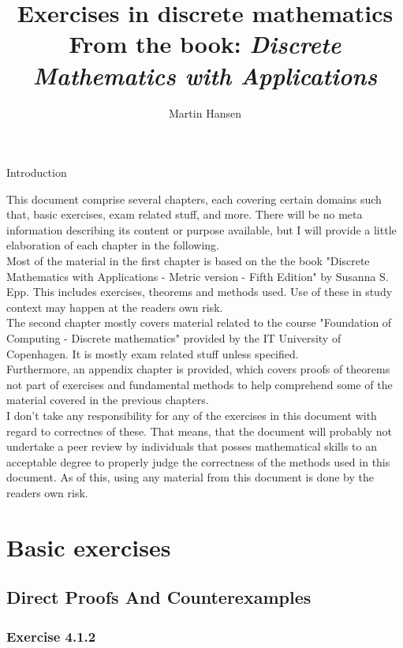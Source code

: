 \documentclass{report}
\author{Martin Hansen}
\title{Exercises in discrete mathematics\\ \small From the book: \textit{Discrete Mathematics with Applications}}
\newcommand{\Section}[1]{\section{#1}}
\newcommand{\Exercise}[1]{\subsection{Exercise #1}}
\begin{document}
	
	\frenchspacing
	\maketitle
	
	\pagebreak
	
	\begin{center}
		\Large Introduction
	\end{center}
	
	This document comprise several chapters, each covering certain domains such that, basic exercises, exam related stuff, and more. There will be no meta information describing its content or purpose available, but I will provide a little elaboration of each chapter in the following.\\
	
	Most of the material in the first chapter is based on the the book "Discrete Mathematics with Applications - Metric version - Fifth Edition" by Susanna S. Epp. This includes exercises, theorems and methods used. Use of these in study context may happen at the readers own risk.\\
	
	The second chapter mostly covers material related to the course "Foundation of Computing - Discrete mathematics" provided by the IT University of Copenhagen. It is mostly exam related stuff unless specified.\\
	
	Furthermore, an appendix chapter is provided, which covers proofs of theorems not part of exercises and fundamental methods to help comprehend some of the material covered in the previous chapters.\\
	
	I don't take any responsibility for any of the exercises in this document with regard to correctnes of these. That means, that the document will probably not undertake a peer review by individuals that posses mathematical skills to an acceptable degree to properly judge the correctness of the methods used in this document. As of this, using any material from this document is done by the readers own risk.
	
	\pagebreak
	
	\tableofcontents
	
	\pagebreak
	
	\chapter{Basic exercises}
	\pagebreak
	\Section{Direct Proofs And Counterexamples}
	\Exercise{4.1.2}
	
\end{document}
